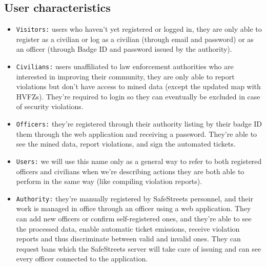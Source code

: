 \documentclass[12pt,a4paper]{article}
\begin{document}
\subsection{User characteristics}
 \begin{itemize}
\item \texttt{Visitors:} users who haven't yet registered or logged in, they are only able to register as a civilian or log as a civilian (through email and password) or as an officer (through Badge ID and password issued by the authority).
\item \texttt{Civilians:} users unaffiliated to law enforcement authorities who are interested in improving their community, they are only able to report violations but don't have access to mined data (except the updated map with HVFZs). They're required to login so they can eventually be excluded in case of security violations.
\item \texttt{Officers:} they're registered through their authority listing by their badge ID them through the web application and receiving a password. They're able to see the mined data, report violations, and sign the automated tickets.
\item \texttt{Users:} we will use this name only as a general way to refer to both registered officers and civilians when we're describing actions they are both able to perform in the same way (like compiling violation reports).
\item  \texttt{Authority:} they're manually registered by SafeStreets personnel, and their work is managed in office through an officer using a web application. They can add new officers or confirm self-registered ones, and they're able to see the processed data, enable automatic ticket emissions, receive violation reports and thus discriminate between valid and invalid ones. They can request bans which the SafeStreets server will take care of issuing and can see every officer connected to the application.
\end{itemize}
\end{document}
